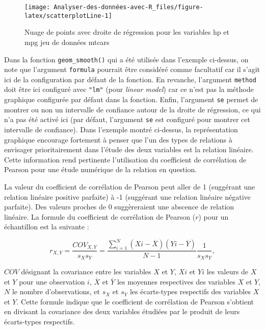 \documentclass[
  french,
]{book}
\begin{document}
\begin{figure}

{\centering \texttt{[image: Analyser-des-données-avec-R\_files/figure-latex/scatterplotLine-1]} 

}

\caption{Nuage de points avec droite de régression pour les variables hp et mpg jeu de données mtcars}\label{fig:scatterplotLine}
\end{figure}

Dans la fonction \texttt{geom\_smooth()} qui a été utilisée dans l'exemple ci-dessus, on note que l'argument \texttt{formula} pourrait être considéré comme facultatif car il s'agit ici de la configuration par défaut de la fonction. En revanche, l'argument \texttt{method} doit être ici configuré avec \texttt{"lm"} (pour \emph{linear model}) car ce n'est pas la méthode graphique configurée par défaut dans la fonction. Enfin, l'argument \texttt{se} permet de montrer ou non un intervalle de confiance autour de la droite de régression, ce qui n'a pas été activé ici (par défaut, l'argument \texttt{se} est configuré pour montrer cet intervalle de confiance). Dans l'exemple montré ci-dessus, la représentation graphique encourage fortement à penser que l'un des types de relations à envisager prioritairement dans l'étude des deux variables est la relation linéaire. Cette information rend pertinente l'utilisation du coefficient de corrélation de Pearson pour une étude numérique de la relation en question.

La valeur du coefficient de corrélation de Pearson peut aller de 1 (suggérant une relation linéaire positive parfaite) à -1 (suggérant une relation linéaire négative parfaite). Des valeurs proches de 0 suggèreraient une abscence de relation linéaire. La formule du coefficient de corrélation de Pearson (\(r\)) pour un échantillon est la suivante :

\[r_{X,Y} =  {\frac{COV_{X,Y}}{s_{X} s_{Y}}} =  {\frac{\sum_{i=1}^{N} (X{i} - \overline{X}) (Y{i} - \overline{Y})}{N-1}} {\frac{1}{s_{X} s_{Y}}},\]

\(COV\) désignant la covariance entre les variables \(X\) et \(Y\), \(X{i}\) et \(Y{i}\) les valeurs de \(X\) et \(Y\) pour une observation \(i\), \(\overline{X}\) et \(\overline{Y}\) les moyennes respectives des variables \(X\) et \(Y\), \(N\) le nombre d'observations, et \(s_{X}\) et \(s_{Y}\) les écarts-types respectifs des variables \(X\) et \(Y\). Cette formule indique que le coefficient de corrélation de Pearson s'obtient en divisant la covariance des deux variables étudiées par le produit de leurs écarts-types respectifs.
\end{document}
